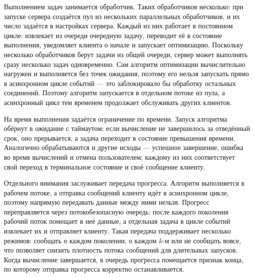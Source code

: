 \documentclass[14pt, a4paper]{extarticle}
\begin{document}
Выполнением задач занимается обработчик. Таких обработчиков несколько: при запуске
сервера создаётся пул из нескольких параллельных обработчиков, и их число задаётся
в настройках сервера. Каждый из них работает в постоянном цикле: извлекает из
очереди очередную задачу, переводит её в состояние выполнения, уведомляет клиента
о начале и запускает оптимизацию. Поскольку несколько обработчиков берут задачи из
общей очереди, сервер может выполнять сразу несколько задач одновременно. Сам
алгоритм оптимизации вычислительно нагружен и выполняется без точек ожидания,
поэтому его нельзя запускать прямо в асинхронном цикле событий --- это заблокировало
бы обработку остальных соединений. Поэтому алгоритм запускается в отдельном потоке
из пула, а асинхронный цикл тем временем продолжает обслуживать других
клиентов.

На время выполнения задаётся ограничение по времени. Запуск алгоритма обёрнут в
ожидание с таймаутом: если вычисление не завершилось за отведённый срок, оно
прерывается, а задача переходит в состояние превышения времени. Аналогично
обрабатываются и другие исходы --- успешное завершение, ошибка во время
вычислений и отмена пользователем; каждому из них соответствует свой переход в
терминальное состояние и своё сообщение клиенту.

Отдельного внимания заслуживает передача прогресса. Алгоритм выполняется в рабочем
потоке, а отправка сообщений клиенту идёт в асинхронном цикле, поэтому напрямую
передавать данные между ними нельзя. Прогресс переправляется через потокобезопасную
очередь: после каждого поколения рабочий поток помещает в неё данные, а отдельная
задача в цикле событий извлекает их и отправляет клиенту. Такая передача
поддерживает несколько режимов: сообщать о каждом поколении, о каждом $k$-м или не
сообщать вовсе, что позволяет снизить плотность потока сообщений для длительных
запусков. Когда вычисление завершается, в очередь прогресса помещается признак
конца, по которому отправка прогресса корректно останавливается.
\end{document}
